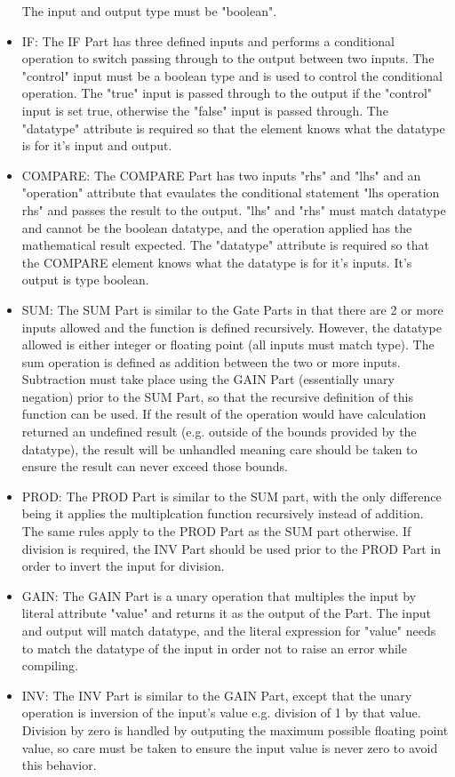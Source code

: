 \begin{itemize}[label={}]
The input and output type must be "boolean".
    \item IF:
The IF Part has three defined inputs and performs a conditional operation to switch passing through to the output between two inputs.
The "control" input must be a boolean type and is used to control the conditional operation.
The "true" input is passed through to the output if the "control" input is set true, otherwise the "false" input is passed through.
The "datatype" attribute is required so that the element knows what the datatype is for it's input and output.
    \item COMPARE:
The COMPARE Part has two inputs "rhs" and "lhs" and an "operation" attribute that evaulates the conditional statement "lhs operation rhs" and passes the result to the output.
"lhs" and "rhs" must match datatype and cannot be the boolean datatype, and the operation applied has the mathematical result expected.
The "datatype" attribute is required so that the COMPARE element knows what the datatype is for it's inputs. It's output is type boolean.
    \item SUM:
The SUM Part is similar to the Gate Parts in that there are 2 or more inputs allowed and the function is defined recursively.
However, the datatype allowed is either integer or floating point (all inputs must match type).
The sum operation is defined as addition between the two or more inputs.
Subtraction must take place using the GAIN Part (essentially unary negation) prior to the SUM Part, so that the recursive definition of this function can be used.
If the result of the operation would have calculation returned an undefined result (e.g. outside of the bounds provided by the datatype), the result will be unhandled meaning care should be taken to ensure the result can never exceed those bounds.
    \item PROD:
The PROD Part is similar to the SUM part, with the only difference being it applies the multiplcation function recursively instead of addition.
The same rules apply to the PROD Part as the SUM part otherwise.
If division is required, the INV Part should be used prior to the PROD Part in order to invert the input for division.
    \item GAIN:
The GAIN Part is a unary operation that multiples the input by literal attribute "value" and returns it as the output of the Part.
The input and output will match datatype, and the literal expression for "value" needs to match the datatype of the input in order not to raise an error while compiling.
    \item INV:
The INV Part is similar to the GAIN Part, except that the unary operation is inversion of the input's value e.g. division of 1 by that value.
Division by zero is handled by outputing the maximum possible floating point value, so care must be taken to ensure the input value is never zero to avoid this behavior.
\end{itemize}
